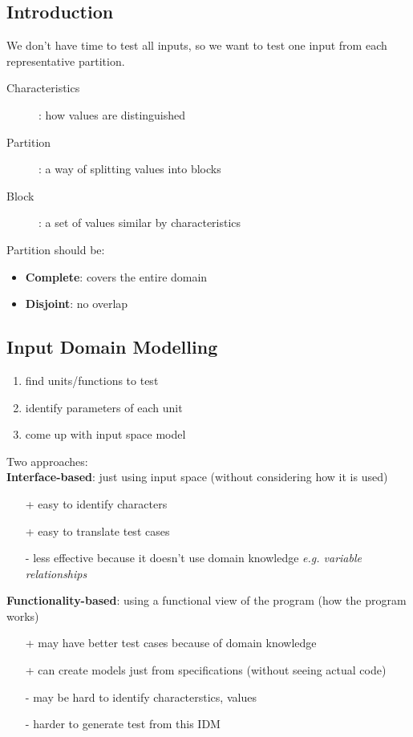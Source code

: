 \documentclass[]{article}
\theoremstyle{definition}
\begin{document}
		\subsection{Introduction}
		We don't have time to test all inputs, so we want to test one input from each representative partition. 
		\begin{description}
			\item[Characteristics]: how values are distinguished
			\item[Partition]: a way of splitting values into blocks
			\item[Block]: a set of values similar by characteristics
		\end{description}
		
		Partition should be:
		\begin{itemize}
			\item \textbf{Complete}: covers the entire domain
			\item \textbf{Disjoint}: no overlap
		\end{itemize}
		
		\subsection{Input Domain Modelling}
		\begin{enumerate}
			\item find units/functions to test
			\item identify parameters of each unit
			\item come up with input space model
		\end{enumerate}
		Two approaches: \\

		\textbf{Interface-based}: just using input space (without considering how it is used)
		\begin{itemize}
			\item[+] easy to identify characters
			\item[+] easy to translate test cases
			\item[-] less effective because it doesn't use domain knowledge \textit{e.g. variable relationships}
		\end{itemize}

		\textbf{Functionality-based}: using a functional view of the program (how the program works)
		\begin{itemize}
			\item[+] may have better test cases because of domain knowledge
			\item[+] can create models just from specifications (without seeing actual code)
			\item[-] may be hard to identify characterstics, values
			\item[-] harder to generate test from this IDM
		\end{itemize}
		
\end{document}
